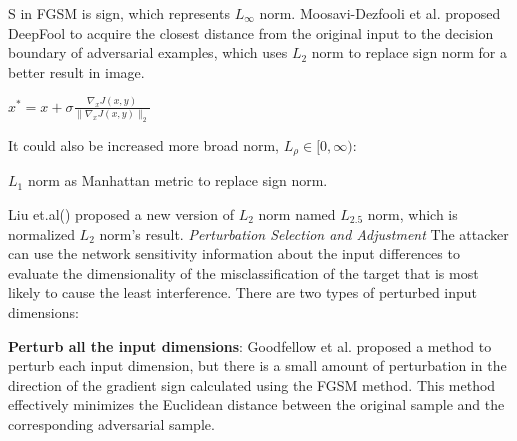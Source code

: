  
 
 
 
 
 
 S in FGSM is sign, which represents  \(L_{\infty}\) norm.
 Moosavi-Dezfooli et al.\cite{moosavi-dezfooli_deepfool_2016} proposed DeepFool to acquire the closest distance from the original input to the decision boundary of adversarial examples, which uses \(L_{2}\) norm to replace sign norm for a better result in image.
 \begin{center}
          \(x^{*} =x+\sigma\frac{\nabla_{x}J(x,y)}{\|\nabla_{x}J(x,y)\|_{2}} \)
\end{center}
 It could also be increased more broad norm, \(L_{\rho}\in [0,\infty)\):
 
 \(L_{1}\) norm as Manhattan metric to replace sign norm. 
 
 Liu et.al(\cite{liu_adversarial_2019}) proposed a new version of \(L_{2}\) norm named \(L_{2.5}\) norm, which is normalized \(L_{2}\) norm's result. 
\textit{Perturbation Selection and Adjustment} 
The attacker can use the network sensitivity information about the input differences to evaluate the dimensionality of the misclassification of the target that is most likely to cause the least interference. There are two types of perturbed input dimensions:

 \textbf{Perturb all the input dimensions}: Goodfellow et al.\cite{goodfellow_explaining_2015} proposed a method to perturb each input dimension, but there is a small amount of perturbation in the direction of the gradient sign calculated using the FGSM method. This method effectively minimizes the Euclidean distance between the original sample and the corresponding adversarial sample. 

